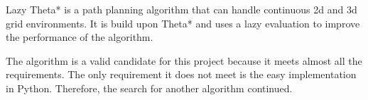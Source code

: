 Lazy Theta* is a path planning algorithm that can handle continuous \acs{2d} and \acs{3d} grid environments. It is build upon Theta* and uses a lazy evaluation to improve the performance of the algorithm. \cite{lazy_theta_star}

The algorithm is a valid candidate for this project because it meets almost all the requirements. The only requirement it does not meet is the easy implementation in Python. Therefore, the search for another algorithm continued.